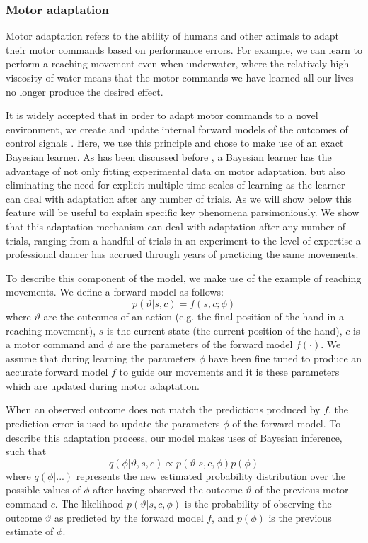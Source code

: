 \documentclass[a4paper,doc,floatsintext,natbib]{apa6}
\begin{document}
\subsubsection{Motor adaptation}
Motor adaptation refers to the ability of humans and other animals to adapt their motor commands based on performance errors. For example, we can learn to perform a reaching movement even when underwater, where the relatively high viscosity of water means that the motor commands we have learned all our lives no longer produce the desired effect.

It is widely accepted that in order to adapt motor commands to a novel environment, we create and update internal forward models of the outcomes of control signals \citep{Wolpert_Multiple_1998}. Here, we use this principle and chose to make use of an exact Bayesian learner. As has been discussed before \cite{Oh_Minimizing_2019}, a Bayesian learner has the advantage of not only fitting experimental data on motor adaptation, but also eliminating the need for explicit multiple time scales of learning as the learner can deal with adaptation after any number of trials. As we will show below this feature will be useful to explain specific key phenomena parsimoniously. We show that this adaptation mechanism can deal with adaptation after any number of trials, ranging from a handful of trials in an experiment to the level of expertise a professional dancer has accrued through years of practicing the same movements.

To describe this component of the model, we make use of the example of reaching movements. We define a forward model as follows:
\begin{equation}
p(\vartheta | s, c) = f(s, c; \phi) \label{eqn:forward-model}
\end{equation}
where $\vartheta$ are the outcomes of an action (e.g. the final position of the hand in a reaching movement), $s$ is the current state (the current position of the hand), $c$ is a motor command and $\phi$ are the parameters of the forward model $f(\cdot)$. We assume that during learning the parameters $\phi$ have been fine tuned to produce an accurate forward model $f$ to guide our movements and it is these parameters which are updated during motor adaptation.

When an observed outcome does not match the predictions produced by $f$, the prediction error is used to update the parameters $\phi$ of the forward model. To describe this adaptation process, our model makes uses of Bayesian inference, such that
\begin{equation}
q(\phi | \vartheta, s, c) \propto p(\vartheta | s, c, \phi)p(\phi) \label{eqn:update-mini}
\end{equation}
where $q(\phi | ...)$ represents the new estimated probability distribution over the possible values of $\phi$ after having observed the outcome $\vartheta$ of the previous motor command $c$. The likelihood $p(\vartheta | s, c, \phi)$ is the probability of observing the outcome $\vartheta$ as predicted by the forward model $f$, and $p(\phi)$ is the previous estimate of $\phi$.
\end{document}

